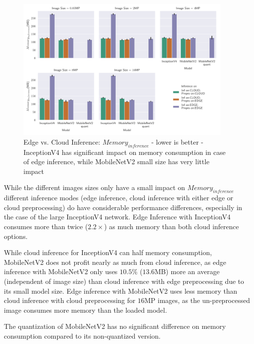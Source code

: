 \begin{figure}[!htb]
\centering
\includegraphics[width=0.95\textwidth]{./Bilder/single_plots/edge_vs_cloud_plots/Edge_vs_Cloud_Inference_Inference_Memory.pdf}
\caption[{Edge vs. Cloud Inference:  $Memory_{inference}$ - lower is better}]{Edge vs. Cloud Inference:  $Memory_{inference}$ - lower is better - InceptionV4 has significant impact on memory consumption in case of edge inference, while MobileNetV2 small size has very little impact}
\label{fig:EdgeVsCloudInferenceMemory}
\end{figure}

While the different images sizes only have a small impact on $Memory_{inference}$ different inference modes (edge inference, cloud inference with either edge or cloud preprocessing) do have considerable performance differences, especially in the case of the large InceptionV4 network.
Edge Inference with InceptionV4 consumes more than twice ($2.2\times$) as much memory than both cloud inference options.

While cloud inference for InceptionV4 can half memory consumption, MobileNetV2 does not profit nearly as much from cloud inference, as edge inference with MobileNetV2 only uses $10.5\%$ ($13.6$MB) more an average (independent of image size) than cloud inference with edge preprocessing due to its small model size.
Edge inference with MobileNetV2 uses less memory than cloud inference with cloud preprocessing for $16$MP images, as the un-preprocessed image consumes more memory than the loaded model. 

The quantization of MobileNetV2 has no significant difference on memory consumption compared to its non-quantized version.


